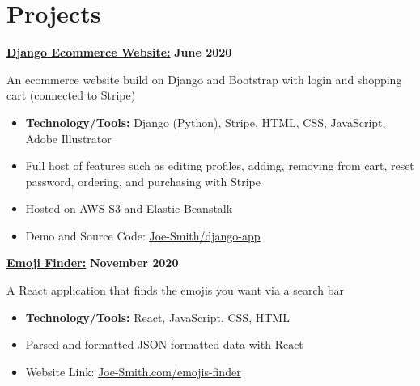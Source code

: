 \documentclass[letterpaper,11pt]{article}
\begin{document}
\section{\color{blue}Projects}
\vspace{5pt}
\begin{addmargin}[1em]{2em}%

\noindent\href{https://github.com/Joe-Smith}{\textbf{Django Ecommerce Website:}}  \hfill \textbf{June 2020} 
\vspace{5pt}

\noindent An ecommerce website build on Django and Bootstrap with login and shopping cart (connected to Stripe)
\vspace{-8pt}
\begin{itemize}
    \item \textbf{Technology/Tools:} Django (Python), Stripe, HTML, CSS, JavaScript, Adobe Illustrator
\vspace{-10pt}
    \item Full host of features such as editing profiles, adding, removing from cart, reset password, ordering, and purchasing with Stripe
\vspace{-10pt}
    \item Hosted on AWS S3 and Elastic Beanstalk
\vspace{-10pt}
    \item Demo and Source Code:   \href{https://github.com/Joe-Smith}{\underline{Joe-Smith/django-app}}
\end{itemize}

\noindent\href{https://github.com/Joe-Smith}{\textbf{Emoji Finder:}}  \hfill \textbf{November 2020} 
\vspace{5pt}

\noindent A React application that finds the emojis you want via a search bar
\vspace{-8pt}
\begin{itemize}
    \item \textbf{Technology/Tools:} React, JavaScript, CSS, HTML
\vspace{-10pt}
    \item Parsed and formatted JSON formatted data with React
\vspace{-10pt}
    \item Website Link:  \href{https://github.com/Joe-Smith}{\underline{Joe-Smith.com/emojis-finder}}
\end{itemize}

\end{addmargin}
\vspace{5pt}
\end{document}
